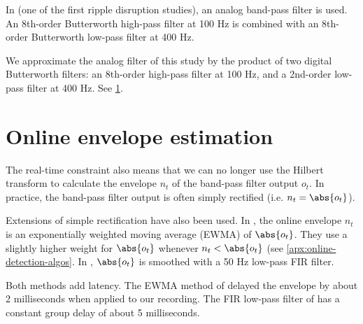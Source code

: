 In  (one of the first ripple disruption studies), an analog band-pass filter is used. An 8th-order Butterworth high-pass filter at 100 Hz is combined with an 8th-order Butterworth low-pass filter at 400 Hz.



We approximate the analog filter of this study by the product of two digital Butterworth filters: an 8th-order high-pass filter at 100 Hz, and a 2nd-order low-pass filter at 400 Hz. See \cref{fig:ego-stengel}.


\begin{figure}
\label{fig:ego-stengel}
\end{figure}







\section{Online envelope estimation}

The real-time constraint also means that we can no longer use the Hilbert transform to calculate the envelope $n_t$ of the band-pass filter output $o_t$. In practice, the band-pass filter output is often simply rectified (i.e. $n_t = \abs{o_t}$).

Extensions of simple rectification have also been used. In , the online envelope $n_t$ is an exponentially weighted moving average (EWMA) of $\abs{o_t}$. They use a slightly higher weight for $\abs{o_t}$  whenever $n_t < \abs{o_t}$ (see \cref{apx:online-detection-algos}. In , $\abs{o_t}$ is smoothed with a 50 Hz low-pass FIR filter.

Both methods add latency. The EWMA method of \citeauthor*{Jadhav2012} delayed the envelope by about 2 milliseconds when applied to our recording. The FIR low-pass filter of \citeauthor*{Dutta2018} has a constant group delay of about 5 milliseconds.

